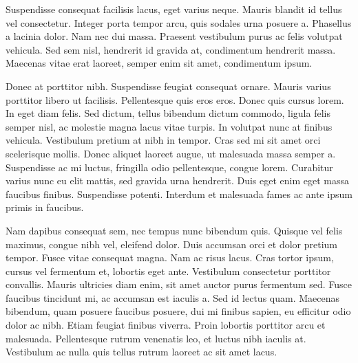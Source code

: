 \documentclass[english]{jamk-report}
\begin{document}
Suspendisse consequat facilisis lacus, eget varius neque. Mauris blandit id
tellus vel consectetur. Integer porta tempor arcu, quis sodales urna posuere a.
Phasellus a lacinia dolor. Nam nec dui massa. Praesent vestibulum purus ac
felis volutpat vehicula. Sed sem nisl, hendrerit id gravida at, condimentum
hendrerit massa.  Maecenas vitae erat laoreet, semper enim sit amet,
condimentum ipsum.~\cite{Puuska_2019,Haar_1910}

Donec at porttitor nibh. Suspendisse feugiat consequat ornare.  Mauris varius
porttitor libero ut facilisis. Pellentesque quis eros eros. Donec quis cursus
lorem. In eget diam felis. Sed dictum, tellus bibendum dictum commodo, ligula
felis semper nisl, ac molestie magna lacus vitae turpis. In volutpat nunc at
finibus vehicula. Vestibulum pretium at nibh in tempor. Cras sed mi sit amet
orci scelerisque mollis. Donec aliquet laoreet augue, ut malesuada massa semper
a. Suspendisse ac mi luctus, fringilla odio pellentesque, congue lorem.
Curabitur varius nunc eu elit mattis, sed gravida urna hendrerit. Duis eget
enim eget massa faucibus finibus. Suspendisse potenti. Interdum et malesuada
fames ac ante ipsum primis in faucibus.

Nam dapibus consequat sem, nec tempus nunc bibendum quis. Quisque vel felis
maximus, congue nibh vel, eleifend dolor. Duis accumsan orci et dolor pretium
tempor. Fusce vitae consequat magna. Nam ac risus lacus. Cras tortor ipsum,
cursus vel fermentum et, lobortis eget ante. Vestibulum consectetur porttitor
convallis. Mauris ultricies diam enim, sit amet auctor purus fermentum sed.
Fusce faucibus tincidunt mi, ac accumsan est iaculis a. Sed id lectus quam.
Maecenas bibendum, quam posuere faucibus posuere, dui mi finibus sapien, eu
efficitur odio dolor ac nibh. Etiam feugiat finibus viverra. Proin lobortis
porttitor arcu et malesuada.  Pellentesque rutrum venenatis leo, et luctus nibh
iaculis at.  Vestibulum ac nulla quis tellus rutrum laoreet ac sit amet lacus.


\end{document}
